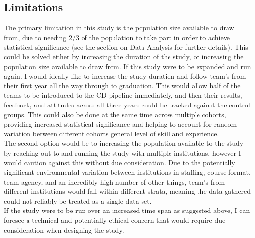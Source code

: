 \documentclass[lettersize,journal]{IEEEtran}
\begin{document}
    \subsection{Limitations}
        The primary limitation in this study is the population size available to draw from, due to needing 2/3 of the population to take part in order to achieve statistical significance (see the section on Data Analysis for further details). This could be solved either by increasing the duration of the study, or increasing the population size available to draw from. If this study were to be expanded and run again, I would ideally like to increase the study duration and follow team's from their first year all the way through to graduation. This would allow half of the teams to be introduced to the CD pipeline immediately, and then their results, feedback, and attitudes across all three years could be tracked against the control groups. This could also be done at the same time across multiple cohorts, providing increased statistical significance and helping to account for random variation between different cohorts general level of skill and experience. \\
        The second option would be to  increasing the population available to the study by reaching out to and running the study with multiple institutions, however I would caution against this without due consideration. Due to the potentially significant environmental variation between institutions in staffing, course format, team agency, and an incredibly high number of other things, team's from different institutions would fall within different strata, meaning the data gathered could not reliably be treated as a single data set. \\
        If the study were to be run over an increased time span as suggested above, I can foresee a technical and potentially ethical concern that would require due consideration when designing the study.
\end{document}
